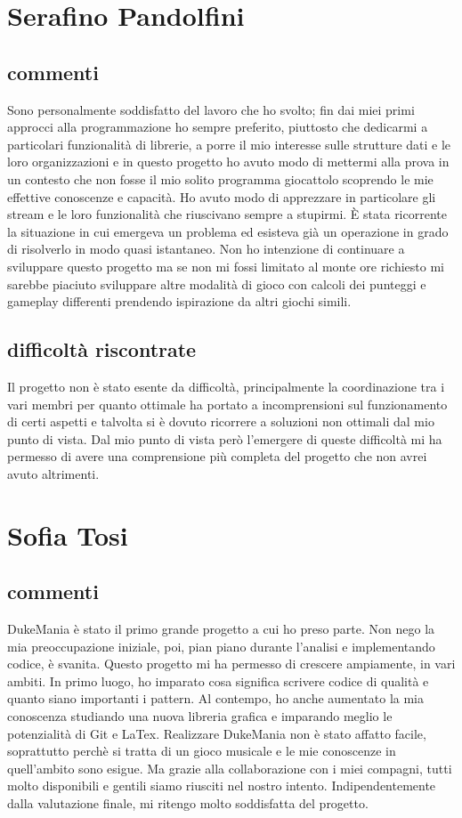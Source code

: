 \documentclass[a4paper,12pt]{report}
\begin{document}
\section{Serafino Pandolfini}
\subsection{commenti}
Sono personalmente soddisfatto del lavoro che ho svolto; fin dai miei primi approcci alla programmazione ho sempre preferito, piuttosto che dedicarmi a particolari funzionalità di librerie, a porre il mio interesse sulle strutture dati e le loro organizzazioni e in questo progetto ho avuto modo di mettermi alla prova in un contesto che non fosse il mio solito programma giocattolo scoprendo le mie effettive conoscenze e capacità. Ho avuto modo di apprezzare in particolare gli stream e le loro funzionalità che riuscivano sempre a stupirmi. È stata ricorrente la situazione in cui emergeva un problema ed esisteva già un operazione in grado di risolverlo in modo quasi istantaneo.
Non ho intenzione di continuare a sviluppare questo progetto ma se non mi fossi limitato al monte ore richiesto mi sarebbe piaciuto sviluppare altre modalità di gioco con calcoli dei punteggi e gameplay differenti prendendo ispirazione da altri giochi simili. 
\subsection{difficoltà riscontrate}
Il progetto non è stato esente da difficoltà, principalmente la coordinazione tra i vari membri per quanto ottimale ha portato a incomprensioni sul funzionamento di certi aspetti e talvolta si è dovuto ricorrere a soluzioni non ottimali dal mio punto di vista. Dal mio punto di vista però l'emergere di queste difficoltà mi ha permesso di avere una comprensione più completa del progetto che non avrei avuto altrimenti.
\newpage
\section{Sofia Tosi}
\subsection{commenti}
DukeMania è stato il primo grande progetto a cui ho preso parte. 
Non nego la mia preoccupazione iniziale, poi, pian piano durante l'analisi e implementando codice, è svanita.
Questo progetto mi ha permesso di crescere ampiamente, in vari ambiti.
In primo luogo, ho imparato cosa significa scrivere codice di qualità e quanto siano importanti i pattern.
Al contempo, ho anche aumentato la mia conoscenza studiando una nuova libreria grafica e imparando meglio le potenzialità di Git e LaTex. 
Realizzare DukeMania non è stato affatto facile, soprattutto perchè si tratta di un gioco musicale e le mie conoscenze in quell'ambito
sono esigue. Ma grazie alla collaborazione con i miei compagni, tutti molto disponibili e gentili siamo riusciti nel nostro intento.
Indipendentemente dalla valutazione finale, mi ritengo molto soddisfatta del progetto.
\end{document}
